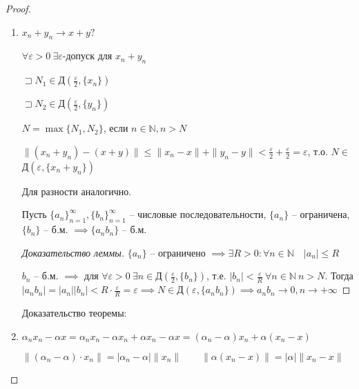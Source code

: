 \documentclass{book}
\newcommand\N{\ensuremath{\mathbb{N}}}
\theoremstyle{definition}
\begin{document}
    \begin{proof}
        \begin{enumerate}
            \item $x_{n} + y_{n} \to  x+y? $

                $\forall \varepsilon>0\ \exists \varepsilon$-допуск для $x_{n} +y_{n} $

                $\sqsupset N_1\in $Д$(\frac{\varepsilon}{2}, \{x_{n} \})$

                $\sqsupset N_2\in$Д$\left( \frac{\varepsilon}{2}, \{y_{n} \} \right) $

                $N = \max\{N_1, N_2\}$, если $n\in \N , n>N$

                $\|(x_{n} +y_{n} ) - (x+y)\|\leqslant \|x_{n} -x\| + \|y_{n} -y\| <\frac{\varepsilon}{2} + \frac{\varepsilon}{2} = \varepsilon$, т.о. $N\in $Д$\left( \varepsilon, \{x_{n} + y_{n} \} \right) $

                Для разности аналогично.

                \begin{lemma}
                    Пусть $\{a_n\}_{n=1}^{\infty }, \{b_n\}_{n=1}^{\infty }    $ -- числовые последовательности, $\{a_n\}$ -- ограничена, $\{b_n\}$ -- б.м. $\implies  \{a_nb_n\}$ -- б.м.
                \end{lemma}
                \begin{proof}
                    [Доказательство леммы]

                    $\{a_n\}$ -- ограничено $\implies \exists R>0: \forall n\in \N \quad |a_n| \leqslant R$

                    $b_n$ -- б.м. $\implies$ для $\forall \varepsilon>0\ \exists n\in \text{Д}\left( \frac{\varepsilon}{2}, \{b_n\} \right) $, т.е. $|b_n|<\frac{\varepsilon}{R}\ \forall n\in \N  ~ n>N$. 
                    Тогда $|a_nb_n| = |a_n| |b_n| <R\cdot \frac{\varepsilon}{R} = \varepsilon \implies N\in \text{Д}\left( \varepsilon, \{a_nb_n\} \right) \implies a_nb_n \to 0, n\to  +\infty  $
                \end{proof}
            Доказательство теоремы:

        \item $\alpha_nx_n - \alpha x = \alpha_nx_n - \alpha x_n + \alpha x_n - \alpha x = (\alpha_n-\alpha)x_n + \alpha(x_n - x)$

            $\|(\alpha_n - \alpha)\cdot x_n\| = |\alpha_n - \alpha|\|x_n\|\qquad \|\alpha(x_n-x)\| = |\alpha|\|x_n-x\|$


\end{enumerate}
\end{proof}
\end{document}
